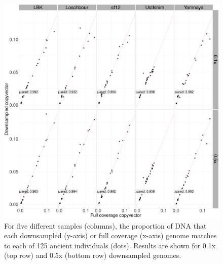 \begin{figure}[htp]
    \centering
    \includegraphics[width=1.0\textwidth]{../images/chapter1/CP_correlation_allSamples_0.1x_0.5x_30x.pdf}
    \caption{For five different samples (columns), the proportion of DNA that each downsampled (y-axis) or full coverage (x-axis) genome matches to each of 125 ancient individuals (dots). Results are shown for 0.1x (top row) and 0.5x (bottom row) downsampled genomes.}
    \label{fig:CP_correlation_allSamples_0.1x_0.5x_30x}
\end{figure}

